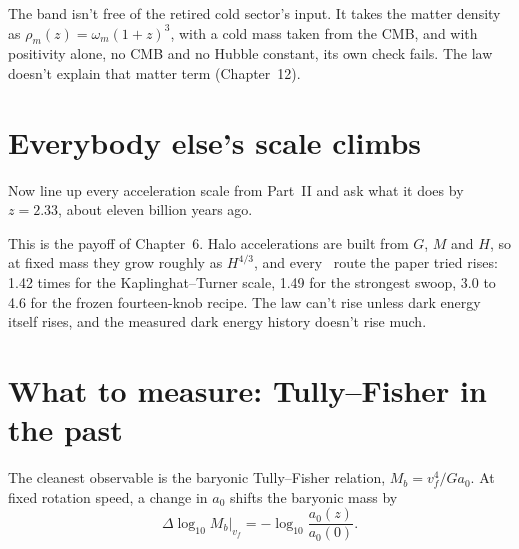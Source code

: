 \begin{honestbox}
The band isn't free of the retired cold sector's input. It takes the matter density as $\rho_m(z)=\omega_m(1+z)^3$, with a cold mass taken from the CMB, and with positivity alone, no CMB and no Hubble constant, its own check fails. The law doesn't explain that matter term (Chapter~12).
\end{honestbox}

\section{Everybody else's scale climbs}

Now line up every acceleration scale from Part~II and ask what it does by $z=2.33$, about eleven billion years ago.


This is the payoff of Chapter~6. Halo accelerations are built from $G$, $M$ and $H$, so at fixed mass they grow roughly as $H^{4/3}$, and every \LCDM\ route the paper tried rises: 1.42 times for the Kaplinghat--Turner scale, 1.49 for the strongest swoop, 3.0 to 4.6 for the frozen fourteen-knob recipe. The law can't rise unless dark energy itself rises, and the measured dark energy history doesn't rise much.

\section{What to measure: Tully--Fisher in the past}

The cleanest observable is the baryonic Tully--Fisher relation, $M_b=v_f^4/Ga_0$. At fixed rotation speed, a change in $a_0$ shifts the baryonic mass by
\begin{equation}
\Delta\log_{10}M_b\big|_{v_f}=-\log_{10}\frac{a_0(z)}{a_0(0)}.
\end{equation}


